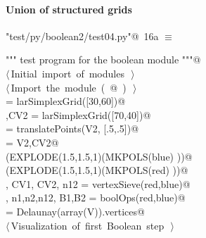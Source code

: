 \documentclass[11pt,oneside]{article}	%
\begin{document}


\paragraph{Union of structured grids}

\begin{flushleft} \small
\begin{minipage}{\linewidth} \label{scrap34}
\protect{}\verb@"test/py/boolean2/test04.py"@\nobreak\ {\footnotesize 16a }$\equiv$
\vspace{-1ex}
\begin{list}{}{} \item
\mbox{}\verb@""" test program for the boolean module """@\\
\mbox{}\verb@@\hbox{$\langle\,$Initial import of modules\nobreak\ {\footnotesize {}}$\,\rangle$}\verb@@\\
\mbox{}\verb@@\hbox{$\langle\,$Import the module\nobreak\ ({\footnotesize {}\label{scrap35}
 }\mbox{}@ ) {\footnotesize {}}$\,\rangle$}\verb@@\\
\mbox{}\verb@blue = larSimplexGrid([30,60])@\\
\mbox{},CV2 = larSimplexGrid([70,40])@\\
\mbox{} = translatePoints(V2, [.5,.5])@\\
\mbox{}\verb@red = V2,CV2@\\
\mbox{}\verb@VIEW(EXPLODE(1.5,1.5,1)(MKPOLS(blue) ))@\\
\mbox{}\verb@VIEW(EXPLODE(1.5,1.5,1)(MKPOLS(red) ))@\\
\mbox{}\verb@V, CV1, CV2, n12 = vertexSieve(red,blue)@\\
\mbox{}\verb@V, n1,n2,n12, B1,B2 = boolOps(red,blue)@\\
\mbox{}\verb@CV = Delaunay(array(V)).vertices@\\
\mbox{}\verb@@\hbox{$\langle\,$Visualization of first Boolean step\nobreak\ {\footnotesize {}}$\,\rangle$}\verb@@\\
\mbox{}\verb@@{\NWsep}
\end{list}
\vspace{-2ex}
\end{minipage}\\[4ex]
\end{flushleft}
\end{document}
